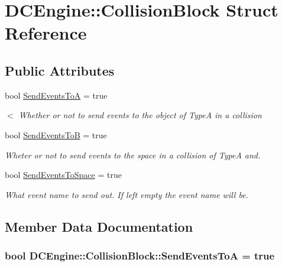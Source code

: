 \hypertarget{structDCEngine_1_1CollisionBlock}{\section{D\-C\-Engine\-:\-:Collision\-Block Struct Reference}
\label{structDCEngine_1_1CollisionBlock}
}
\subsection*{Public Attributes}
\begin{DoxyCompactItemize}
\item 
bool \hyperlink{structDCEngine_1_1CollisionBlock_a51e7188179af1d8acc25e7c42e887704}{Send\-Events\-To\-A} = true
\begin{DoxyCompactList}\small\item\em $<$ Whether or not to send events to the object of Type\-A in a collision \end{DoxyCompactList}\item 
\hypertarget{structDCEngine_1_1CollisionBlock_a9364f34b3f69a115385ba4216f7293f3}{bool \hyperlink{structDCEngine_1_1CollisionBlock_a9364f34b3f69a115385ba4216f7293f3}{Send\-Events\-To\-B} = true}\label{structDCEngine_1_1CollisionBlock_a9364f34b3f69a115385ba4216f7293f3}

\begin{DoxyCompactList}\small\item\em Wheter or not to send events to the space in a collision of Type\-A and. \end{DoxyCompactList}\item 
\hypertarget{structDCEngine_1_1CollisionBlock_a40abc33b90d9045d76ce6c6de9c21c25}{bool \hyperlink{structDCEngine_1_1CollisionBlock_a40abc33b90d9045d76ce6c6de9c21c25}{Send\-Events\-To\-Space} = true}\label{structDCEngine_1_1CollisionBlock_a40abc33b90d9045d76ce6c6de9c21c25}

\begin{DoxyCompactList}\small\item\em What event name to send out. If left empty the event name will be. \end{DoxyCompactList}\end{DoxyCompactItemize}


\subsection{Member Data Documentation}
\hypertarget{structDCEngine_1_1CollisionBlock_a51e7188179af1d8acc25e7c42e887704}{
\subsubsection[{Send\-Events\-To\-A}]{\setlength{\rightskip}{0pt plus 5cm}bool D\-C\-Engine\-::\-Collision\-Block\-::\-Send\-Events\-To\-A = true}}\label{structDCEngine_1_1CollisionBlock_a51e7188179af1d8acc25e7c42e887704}


